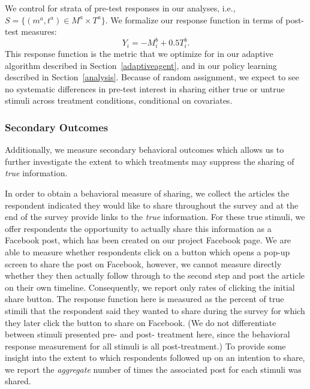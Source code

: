 \documentclass[letterpaper, 12pt, parskip=full,]{scrartcl}
\begin{document}
We control for strata of pre-test responses in our analyses, i.e., $S=\{(m^a, t^a)\in M^a \times T^a\}$. 
We formalize our response function in terms of post-test measures:
\[
Y_i = -M^b_i + 0.5 T^b_i.
\]
This response function is the metric that we optimize for in our adaptive algorithm described in Section~\ref{adaptiveagent}, and in our policy learning described in Section~\ref{analysis}. Because of random assignment, we expect to see no systematic differences in pre-test interest in sharing either true or untrue stimuli across treatment conditions, conditional on covariates. %




\subsubsection{Secondary Outcomes}
Additionally, we measure secondary behavioral outcomes which allows us to further investigate the extent to which treatments may suppress the sharing of \textit{true} information.

In order to obtain a behavioral measure of sharing, we collect the articles the respondent indicated they would like to share throughout the survey and at the end of the survey provide links to the \textit{true} information. For these true stimuli, we offer respondents the opportunity to actually share this information as a Facebook post, which has been created on our project Facebook page. We are able to measure whether respondents click on a button which opens a pop-up screen to share the post on Facebook, however, we cannot measure directly whether they then actually follow through to the second step and post the article on their own timeline. Consequently, we report only rates of clicking the initial share button. The response function here is measured as the percent of true stimili that the respondent said they wanted to share during the survey for which they later click the button to share on Facebook. (We do not differentiate between stimuli presented pre- and post- treatment here, since the behavioral response measurement for all stimuli is all post-treatment.) To provide some insight into the extent to which respondents followed up on an intention to share, we report the \textit{aggregate} number of times the associated post for each stimuli was shared. %
\end{document}

